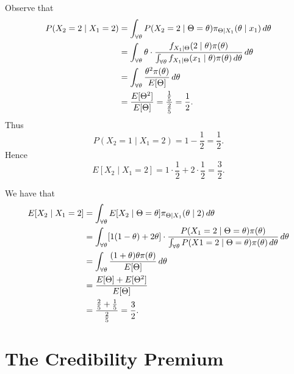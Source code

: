 \documentclass[notoc,notitlepage]{tufte-book}
\begin{document}
\begin{solution}
   Observe that
  \begin{align*}
    P(X_2 = 2 \mid X_1 = 2)
    &= \int_{\forall \theta} P(X_2 = 2 \mid \Theta = \theta) \pi_{\Theta \mid
      X_1}(\theta \mid x_1) \mathop{}\!d{\theta} \\
    &= \int_{\forall \theta} \theta \cdot \frac{f_{X_1 \mid \Theta}(2 \mid
      \theta) \pi(\theta)}{\int_{\forall \theta} f_{X_1 \mid \Theta}(x_1 \mid
      \theta) \pi(\theta) \mathop{}\!d{\theta}} \mathop{}\!d{\theta} \\
    &= \int_{\forall \theta} \frac{\theta^2 \pi(\theta)}{E[\Theta]} \mathop{}\!d{\theta}
    \\
    &= \frac{E[\Theta^2]}{E[\Theta]} = \frac{\frac{1}{5}}{\frac{2}{5}} =
    \frac{1}{2}.
  \end{align*}
  Thus
  \begin{equation*}
    P(X_2 = 1 \mid X_1 = 2) = 1 - \frac{1}{2} = \frac{1}{2}.
  \end{equation*}
  Hence
  \begin{equation*}
    E[X_2 \mid X_1 = 2] = 1 \cdot \frac{1}{2} + 2 \cdot \frac{1}{2} =
    \frac{3}{2}.
  \end{equation*}

  \noindent
   We have that
  \begin{align*}
    E[X_2 \mid X_1 = 2]
    &= \int_{\forall \theta} E[X_2 \mid \Theta = \theta] \pi_{\Theta \mid
      X_1}(\theta \mid 2) \mathop{}\!d{\theta} \\
    &= \int_{\forall \theta} [1(1 - \theta) + 2\theta] \cdot
    \frac{P(X_1 = 2 \mid \Theta = \theta)\pi(\theta)}{\int_{\forall \theta} P(X1
      = 2 \mid \Theta = \theta)\pi(\theta) \mathop{}\!d{\theta}} \mathop{}\!d{\theta} \\
    &= \int_{\forall \theta} \frac{(1 + \theta)\theta\pi(\theta)}{E[\Theta]}
      \mathop{}\!d{\theta} \\
    &= \frac{E[\Theta] + E[\Theta^2]}{E[\Theta]} \\
    &= \frac{\frac{2}{5} + \frac{1}{5}}{\frac{2}{5}} = \frac{3}{2}.
  \end{align*}
\end{solution}


\section{The Credibility Premium}%
\label{sec:the_credibility_premium}
\end{document}
